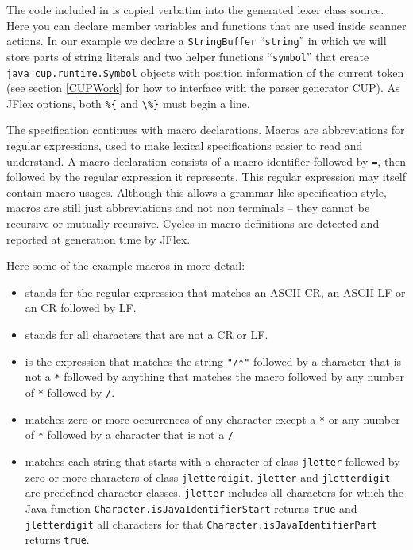 \documentclass[11pt]{scrartcl}
\newcommand{\bl}{\latex{\symbol{123}}\html{\{}}
\newcommand{\br}{\latex{\symbol{125}}\html{\}}}
\begin{document}
The code included in \texttt{\htmlref{\%\bl  ...\%\br}{CodeScannerCode}}
is copied verbatim into the generated lexer class source.
Here you can declare member variables and functions that are used
inside scanner actions. In our example we declare a \texttt{StringBuffer} ``\texttt{string}''
in which we will store parts of string literals and two helper functions
``\texttt{symbol}'' that create \texttt{java\_cup.runtime.Symbol} objects
with position information of the current token (see section \ref{CUPWork}
for how to interface with the parser generator CUP). As JFlex options, both 
\verb+%{+ and \verb+\%}+ must begin a line. 
\label{ExampleMacros}

The specification continues with macro declarations. Macros are
abbreviations for regular expressions, used to make lexical specifications
easier to read and understand. A macro declaration
consists of a macro identifier followed by \texttt{=}, then followed by
the regular expression it represents.  This regular expression may
itself contain macro usages. Although this allows a grammar like specification
style, macros are still just abbreviations and not non terminals -- they
cannot be recursive or mutually recursive. Cycles in macro definitions
are detected and reported at generation time by JFlex.

Here some of the example macros in more detail:
\begin{itemize}
\item
  \texttt{} stands for the regular
  expression that matches an ASCII CR, an ASCII LF or an CR followed by LF.

\item
  \texttt{} stands for all characters
  that are not a CR or LF.

\item
  \texttt{} is the expression
  that matches the string \texttt{"/*"} followed by a character that is not
  a \texttt{*} followed by anything that matches the macro 
  \texttt{}
  followed by any number of \texttt{*} followed by \texttt{/}.

\item
  \texttt{} matches zero or more
  occurrences of any character except a \texttt{*} or any number of 
  \texttt{*} followed by a character that is not a \texttt{/}

\item
  \texttt{} matches each string that
  starts with a character of class \texttt{jletter} followed by zero or more characters
  of class \texttt{jletterdigit}. \texttt{jletter} and \texttt{jletterdigit}
  are predefined character classes.  \texttt{jletter} includes all characters for which
  the Java function \texttt{Character.isJavaIdentifierStart} returns \texttt{true} and 
  \texttt{jletterdigit} all characters for that \texttt{Character.isJavaIdentifierPart}
  returns \texttt{true}. 
\end{itemize}
\label{ExampleStateDecl}
\end{document}

